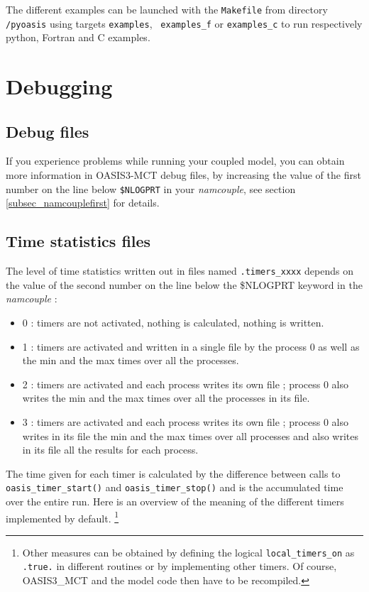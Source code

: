 The different examples can be launched with the {\tt Makefile} from
directory {\tt /pyoasis} using targets {\tt examples}, {\tt
  examples\_f} or 
  {\tt examples\_c} to run respectively python, Fortran and C examples.

\section{Debugging}
\label{subsec_debug}

\subsection{Debug files}
If you experience problems while running your coupled model,  you can obtain more information in OASIS3-MCT debug files, by
increasing the value of the first number on the line below {\tt \$NLOGPRT} in your {\it namcouple}, see section
\ref{subsec_namcouplefirst} for details.

\subsection{Time statistics files}
\label{timestat}

The level of time statistics written out in files named {\tt *.timers\_xxxx} depends on the value of the second number on the line below the \$NLOGPRT keyword in the {\it namcouple} :

\begin{itemize}
\item 0 : timers are not activated, nothing is calculated, nothing is written.
\item 1 : timers are activated and written in a
  single file by the process 0 as well as the min and the max times
  over all the processes.
\item 2 : timers are activated and each process
  writes its own file ; process 0 also writes the min and the max
  times over all the processes in its file.
\item 3 : timers are activated and each process
  writes its own file ; process 0 also writes in its file the min
  and the max times over all processes and also writes in its file
  all the results for each process.
\end{itemize}
 
The time given for each timer is calculated by the difference between
calls to {\tt oasis\_timer\_start()} and {\tt oasis\_timer\_stop()}
and is the accumulated time over the entire run. Here is an overview
of the meaning of the different timers implemented by default.
\footnote{Other measures can be obtained by defining the logical
{\tt local\_timers\_on} as {\tt .true.} in different routines or by
implementing other timers. Of course, OASIS3\_MCT and the model code then have to be recompiled.}

